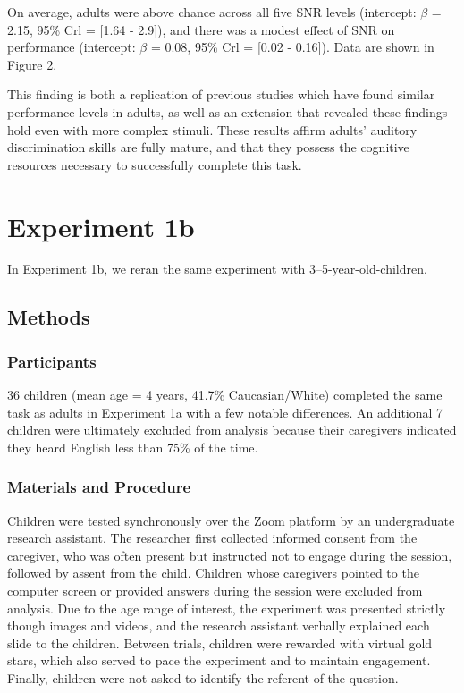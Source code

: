 \documentclass[10pt, letterpaper]{article}
\begin{document}
On average, adults were above chance across all five SNR levels
(intercept: \(\beta\) = 2.15, 95\% Crl = {[}1.64 - 2.9{]}), and there
was a modest effect of SNR on performance (intercept: \(\beta\) = 0.08,
95\% Crl = {[}0.02 - 0.16{]}). Data are shown in Figure 2.

This finding is both a replication of previous studies which have found
similar performance levels in adults, as well as an extension that
revealed these findings hold even with more complex stimuli. These
results affirm adults' auditory discrimination skills are fully mature,
and that they possess the cognitive resources necessary to successfully
complete this task.

\hypertarget{experiment-1b}{%
\section{Experiment 1b}\label{experiment-1b}}

In Experiment 1b, we reran the same experiment with
3--5-year-old-children.

\hypertarget{methods-1}{%
\subsection{Methods}\label{methods-1}}

\hypertarget{participants-1}{%
\subsubsection{Participants}\label{participants-1}}

36 children (mean age = 4 years, 41.7\% Caucasian/White) completed the
same task as adults in Experiment 1a with a few notable differences. An
additional 7 children were ultimately excluded from analysis because
their caregivers indicated they heard English less than 75\% of the
time.

\hypertarget{materials-and-procedure-1}{%
\subsubsection{Materials and
Procedure}\label{materials-and-procedure-1}}

Children were tested synchronously over the Zoom platform by an
undergraduate research assistant. The researcher first collected
informed consent from the caregiver, who was often present but
instructed not to engage during the session, followed by assent from the
child. Children whose caregivers pointed to the computer screen or
provided answers during the session were excluded from analysis. Due to
the age range of interest, the experiment was presented strictly though
images and videos, and the research assistant verbally explained each
slide to the children. Between trials, children were rewarded with
virtual gold stars, which also served to pace the experiment and to
maintain engagement. Finally, children were not asked to identify the
referent of the question.
\end{document}
